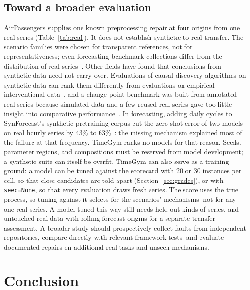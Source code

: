 \documentclass[11pt,a4paper]{article}
\newcommand{\code}[1]{\texttt{#1}}
\begin{document}
\subsection{Toward a broader evaluation}
\label{sec:broader}

AirPassengers supplies one known preprocessing repair at four origins
from one real series (Table~\ref{tab:real}). It does not establish
synthetic-to-real transfer. The scenario families were chosen for
transparent references, not for representativeness; even forecasting
benchmark collections differ from the distribution of real
series~\cite{spiliotis2020forecasting}.
Other fields have found that conclusions from synthetic data need not
carry over. Evaluations of causal-discovery algorithms on synthetic data
can rank them differently from evaluations on empirical interventional
data~\cite{gentzel2019case}, and a change-point benchmark was built from
annotated real series because simulated data and a few reused real series
gave too little insight into comparative
performance~\cite{vandenburg2020evaluation}. In forecasting, adding daily
cycles to SynForecast's synthetic pretraining corpus cut the zero-shot
error of two models on real hourly series by 43\% to
63\%~\cite{sprangers2026synforecast}: the missing mechanism explained most
of the failure at that frequency. TimeGym ranks no models for that reason.
Seeds, parameter regions, and compositions
must be reserved from model development; a synthetic suite can itself be
overfit. TimeGym can also serve as a training ground: a model can be tuned
against the scorecard with 20 or 30 instances per cell, so that close
candidates are told apart (Section~\ref{sec:grades}), or with
\code{seed=None}, so that every evaluation draws fresh series. The score
uses the true process, so tuning against it selects for the scenarios'
mechanisms, not for any one real series. A model tuned this way still needs held-out kinds of series, and
untouched real data with rolling forecast origins for a separate transfer
assessment.
A broader study should prospectively collect faults from independent
repositories, compare directly with relevant framework tests, and
evaluate documented repairs on additional real tasks and unseen
mechanisms.

\section{Conclusion}
\end{document}
